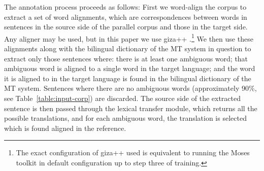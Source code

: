 \documentclass[11pt]{article}
\begin{document}
The annotation process proceeds as follows: First we word-align the
corpus to extract a set of word alignments, which are correspondences
between words in sentences in the source side of the parallel corpus
and those in the target side. Any aligner may be used, but in this
paper we use {\sc giza++} \citep{och03a}.\footnote{The exact
  configuration of {\sc giza++} used is equivalent to running the {\sc
    Moses} toolkit \citep{koehn07} in default configuration up to step
  three of training.}  We then use
these alignments along with the bilingual dictionary of the MT system
in question to extract only those sentences where: there is at least
one ambiguous word; that ambiguous word is aligned to a single word in
the target language; and the word it is aligned to in the target
language is found in the bilingual dictionary of the MT
system. Sentences where there are no ambiguous words (approximately
90\%, see Table~\ref{table:input-corp}) are discarded. The source side
of the extracted sentence is then passed through the lexical transfer
module, which returns all the possible translations, and for each
ambiguous word, the translation is selected which is found aligned in
the reference.

\end{document}
